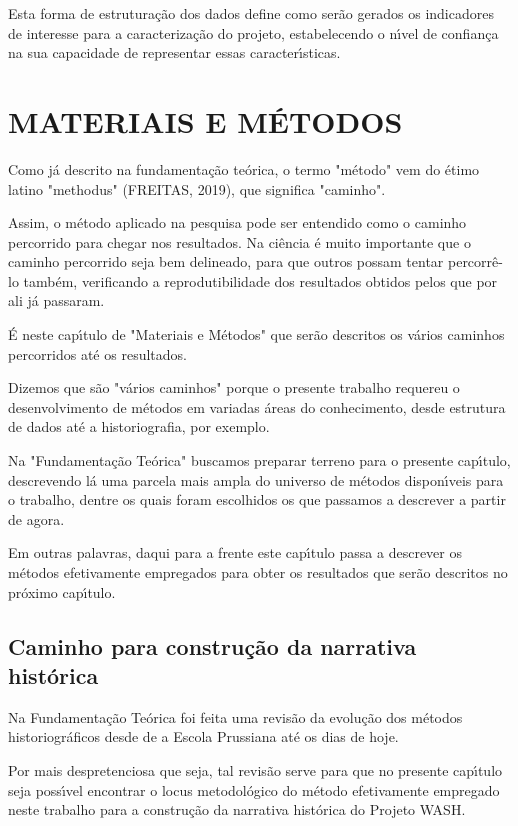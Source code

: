 \documentclass[
12pt,		%
openright,	%
twoside,  %
a4paper,			%
chapter=TITLE,		%
english,			%
french,				%
spanish,			%
brazil				%
]{USPSC-classe/USPSC}
\begin{document}
Esta forma de estrutura\c{c}\~ao dos dados define como ser\~ao gerados os indicadores de interesse para a caracteriza\c{c}\~ao do projeto, estabelecendo o n\'{\i}vel de confian\c{c}a na sua capacidade de representar essas caracter\'{\i}sticas.


\chapter[MATERIAIS E M\'ETODOS]{MATERIAIS E M\'ETODOS}\label{MATERIAIS E M\'ETODOS}
Como j\'a descrito na fundamenta\c{c}\~ao te\'orica, o termo "m\'etodo" vem do \'etimo latino "methodus"  (FREITAS, 2019), que significa "caminho".


Assim, o m\'etodo aplicado na pesquisa pode ser entendido como o caminho percorrido para chegar nos resultados. Na ci\^encia \'e muito importante que o caminho percorrido seja bem delineado, para que outros possam tentar percorr\^e-lo tamb\'em, verificando a reprodutibilidade dos resultados obtidos pelos que por ali j\'a passaram.


\'E neste cap\'{\i}tulo de "Materiais e M\'etodos" que ser\~ao descritos os v\'arios caminhos percorridos at\'e os resultados.


Dizemos que s\~ao "v\'arios caminhos" porque o presente trabalho requereu o desenvolvimento de m\'etodos em variadas \'areas do conhecimento, desde estrutura de dados at\'e a historiografia, por exemplo.


Na "Fundamenta\c{c}\~ao Te\'orica" buscamos preparar terreno para o presente cap\'{\i}tulo, descrevendo l\'a uma parcela mais ampla do universo de m\'etodos dispon\'{\i}veis para o trabalho, dentre os quais foram escolhidos os que passamos a descrever a partir de agora.


Em outras palavras, daqui para a frente este cap\'{\i}tulo passa a descrever os m\'etodos efetivamente empregados para obter os resultados que ser\~ao descritos no pr\'oximo cap\'{\i}tulo.


\section[Caminho para constru\c{c}\~ao da narrativa hist\'orica]{Caminho para constru\c{c}\~ao da narrativa hist\'orica}\label{Caminho para constru\c{c}\~ao da narrativa hist\'orica}
Na Fundamenta\c{c}\~ao Te\'orica foi feita uma revis\~ao da evolu\c{c}\~ao dos m\'etodos historiogr\'aficos desde de a Escola Prussiana at\'e os dias de hoje.


Por mais despretenciosa que seja, tal revis\~ao serve para que no presente cap\'{\i}tulo seja poss\'{\i}vel encontrar o locus metodol\'ogico do m\'etodo efetivamente empregado neste trabalho para a constru\c{c}\~ao da narrativa hist\'orica do Projeto WASH.
\end{document}
